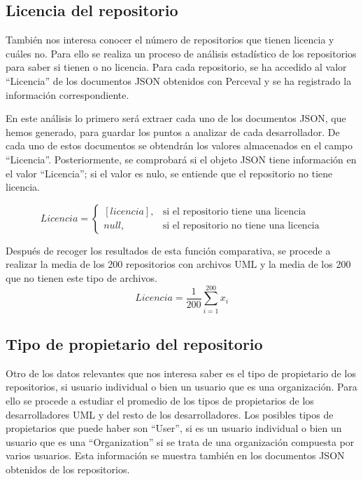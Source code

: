 \documentclass[a4paper, 12pt]{book}
\begin{document}
\subsection{Licencia del repositorio} %
\label{sec:licencia del repositorio}
También nos interesa conocer el número de repositorios que tienen licencia y cuáles no.
Para ello se realiza un proceso de análisis estadístico de los repositorios para saber si tienen o no licencia.
Para cada repositorio, se ha accedido al valor ``Licencia'' de los documentos JSON obtenidos con Perceval y se ha registrado la información correspondiente.

En este análisis lo primero será extraer cada uno de los documentos JSON, que hemos generado, para guardar los puntos a analizar de cada desarrollador.
De cada uno de estos documentos se obtendrán los valores almacenados en el campo ``Licencia''.
Posteriormente, se comprobará si el objeto JSON tiene información en el valor ``Licencia''; si el valor es nulo, se entiende que el repositorio no tiene licencia.


\begin{equation}
  Licencia =
  \begin{cases}
  [licencia], & \text{si el repositorio tiene una licencia} \\
  null, & \text{si el repositorio no tiene una licencia}
  \end{cases}
\end{equation}

Después de recoger los resultados de esta función comparativa, se procede a realizar la media de los 200 repositorios con archivos UML y la media de los 200 que no tienen este tipo de archivos.
\[{Licencia} = \frac{1}{200} \sum_{i=1}^{200} x_i\]


\subsection{Tipo de propietario del repositorio} %
\label{sec:tipo de propietario del repositorio}

Otro de los datos relevantes que nos interesa saber es el tipo de propietario de los repositorios, si usuario individual o bien un usuario que es una organización. 
Para ello se procede a estudiar el promedio de los tipos de propietarios de los desarrolladores UML y del resto de los desarrolladores.
Los posibles tipos de propietarios que puede haber son ``User'', si es un usuario individual o bien un usuario que es una ``Organization'' si se trata de una organización compuesta por varios usuarios.
Esta información se muestra también en los documentos JSON obtenidos de los repositorios.
\end{document}
